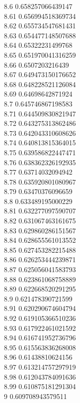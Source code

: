 {8.6	0.658257066439147\\
8.61	0.656994518369734\\
8.62	0.655734547681431\\
8.63	0.654477148507688\\
8.64	0.65322231499768\\
8.65	0.651970041316259\\
8.66	0.6507203216439\\
8.67	0.649473150176652\\
8.68	0.648228521126084\\
8.69	0.64698642871924\\
8.7	0.645746867198583\\
8.71	0.644509830821947\\
8.72	0.643275313862486\\
8.73	0.642043310608626\\
8.74	0.640813815364015\\
8.75	0.639586822447471\\
8.76	0.638362326192935\\
8.77	0.63714032094942\\
8.78	0.635920801080967\\
8.79	0.63470376096659\\
8.8	0.633489195000229\\
8.81	0.632277097590707\\
8.82	0.631067463161675\\
8.83	0.629860286151567\\
8.84	0.628655561013552\\
8.85	0.627453282215488\\
8.86	0.626253444239871\\
8.87	0.625056041583793\\
8.88	0.623861068758889\\
8.89	0.622668520291295\\
8.9	0.621478390721599\\
8.91	0.620290674604794\\
8.92	0.619105366510236\\
8.93	0.617922461021592\\
8.94	0.616741952736796\\
8.95	0.615563836268008\\
8.96	0.61438810624156\\
8.97	0.613214757297919\\
8.98	0.612043784091636\\
8.99	0.610875181291304\\
9	0.609708943579511\\
}
